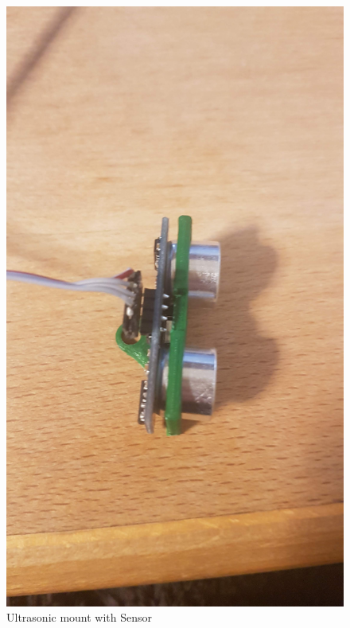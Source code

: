 \begin{figure}[h]
\begin{minipage}{.5\textwidth}
\end{minipage}
\begin{minipage}{.5\textwidth}
	\includegraphics[width = 1\textwidth]{"assets/sonicmount_inside_B"}
	\centering
\end{minipage}
\caption{Ultrasonic mount with Sensor}
	\label{fig:sonicmount_withSR-04_A}
\end{figure}

